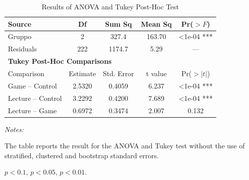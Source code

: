 \begin{table}[ht]
\centering
\caption{Results of ANOVA and Tukey Post-Hoc Test}
\begin{tabular}{lcccc}
\toprule
\textbf{Source} & \textbf{Df} & \textbf{Sum Sq} & \textbf{Mean Sq} & \textbf{Pr($>F$)} \\
\midrule
Gruppo      & 2 & 327.4 & 163.70 & <1e-04 *** \\
Residuals   & 222 & 1174.7 & 5.29 & --- \\
\midrule
\multicolumn{5}{l}{\textbf{Tukey Post-Hoc Comparisons}} \\
\midrule
Comparison & Estimate & Std. Error & t value & Pr($>|t|$) \\
\midrule
Game -- Control & 2.5320 & 0.4059 & 6.237 & <1e-04 *** \\
Lecture -- Control & 3.2292 & 0.4200 & 7.689 & <1e-04 *** \\
Lecture -- Game & 0.6972 & 0.3474 & 2.007 & 0.132 \\
\bottomrule
\end{tabular}
\label{tab:anova_tukey}
{\begin{flushleft}\parbox{\textwidth}{\tiny \hspace*{0.1cm}
\textit{Notes:}} The table reports the result for the ANOVA and Tukey test without the use of stratified, clustered and bootstrap standard errors.
\item \sym{*} $p<0.1$, \sym{**} $p<0.05$, \sym{***} $p<0.01$.
\end{flushleft}}
\end{table}
